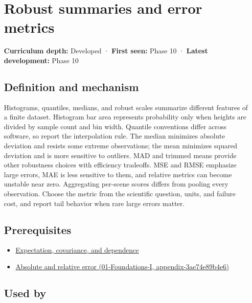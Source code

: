 \hypertarget{appendix-bcc44e9d3d02}{}
\section{Robust summaries and error metrics}\label{appendix-bcc44e9d3d02-robust-summaries-and-error-metrics}

\textbf{Curriculum depth:} Developed · \textbf{First seen:} Phase 10 · \textbf{Latest development:} Phase 10

\subsection{Definition and mechanism}\label{appendix-bcc44e9d3d02-definition-and-mechanism}

Histograms, quantiles, medians, and robust scales summarize different features of a finite dataset. Histogram bar area represents probability only when heights are divided by sample count and bin width. Quantile conventions differ across software, so report the interpolation rule. The median minimizes absolute deviation and resists some extreme observations; the mean minimizes squared deviation and is more sensitive to outliers. MAD and trimmed means provide other robustness choices with efficiency tradeoffs. MSE and RMSE emphasize large errors, MAE is less sensitive to them, and relative metrics can become unstable near zero. Aggregating per-scene scores differs from pooling every observation. Choose the metric from the scientific question, units, and failure cost, and report tail behavior when rare large errors matter.

\subsection{Prerequisites}\label{appendix-bcc44e9d3d02-prerequisites}

\begin{itemize}
\tightlist
\item
  \hyperref[appendix-54c383df9992]{Expectation, covariance, and dependence}
\item
  \href{../01-Foundations-I/main.pdf\#nameddest=appendix-3ae74e89b4e6}{Absolute and relative error (01-Foundations-I, appendix-3ae74e89b4e6)}
\end{itemize}

\subsection{Used by}\label{appendix-bcc44e9d3d02-used-by}

